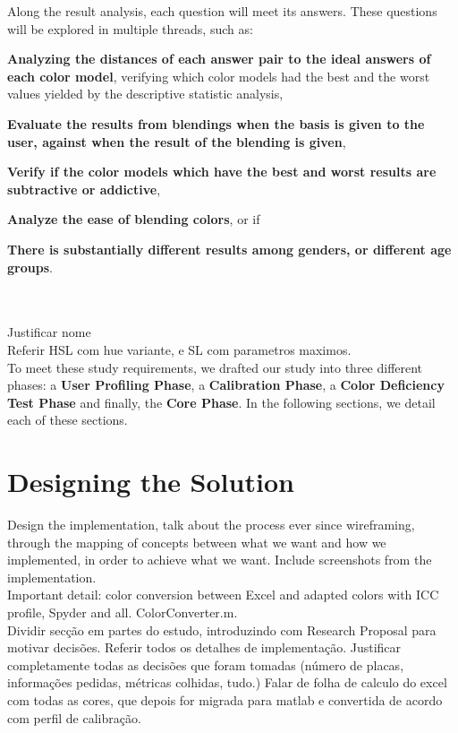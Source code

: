 %
Along the result analysis, each question will meet its answers. These questions will be explored in multiple threads, such as:
%
\begin{enumerate*}
		\item \textbf{Analyzing the distances of each answer pair to the ideal answers of each color model}, verifying which color models had the best and the worst
		values yielded by the descriptive statistic analysis,
		\item \textbf{Evaluate the results from blendings when the basis is given to the user, against when the result of the blending is given},
		\item \textbf{Verify if the color models which have the best and worst results are subtractive or addictive},
		\item \textbf{Analyze the ease of blending colors}, or if
		\item \textbf{There is substantially different results among genders, or different age groups}.
\end{enumerate*}
\\ \\
%
Justificar nome \\
Referir HSL com hue variante, e SL com parametros maximos. \\

To meet these study requirements, we drafted our study into three different phases: a \textbf{User Profiling Phase}, a \textbf{Calibration Phase}, a \textbf{Color Deficiency Test Phase} and finally, the \textbf{Core Phase}. In the following sections, we detail each of these sections. \par
%
\section{Designing the Solution}
\label{sec:impl_designingsolution}
Design the implementation, talk about the process ever since wireframing, through the mapping of concepts between
what we want and how we implemented, in order to achieve what we want. Include screenshots from the implementation. \\

Important detail: color conversion between Excel and adapted colors with ICC profile, Spyder and all. ColorConverter.m. \\
%
Dividir secção em partes do estudo, introduzindo com Research Proposal para motivar decisões. Referir todos os detalhes de implementação.
Justificar completamente todas as decisões que foram tomadas (número de placas, informações pedidas, métricas colhidas, tudo.)
%
Falar de folha de calculo do excel com todas as cores, que depois for migrada para matlab
e convertida de acordo com perfil de calibração.
%
